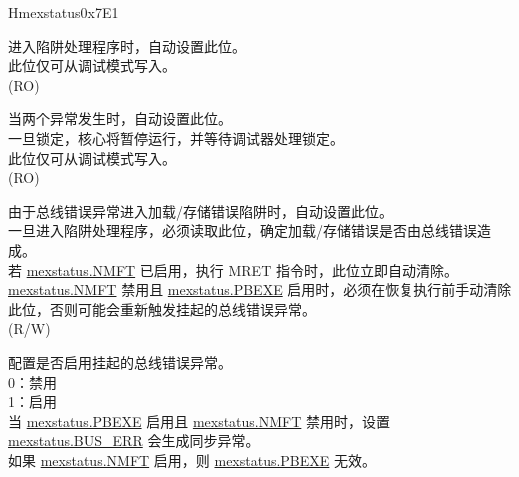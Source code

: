 \begin{register}{H}{mexstatus}{0x7E1}\label{regdesc:MEXSTATUS}%
%
%
%
%
%
%
%
%
%
%
%
%
%
\regnewline%
\begin{regdesc}\begin{reglist}
\label{fielddesc:MEXSTATUS_EXPT_VLD}\item [EXPT\_VLD] 进入陷阱处理程序时，自动设置此位。\\
此位仅可从调试模式写入。\\
(RO)
\label{fielddesc:MEXSTATUS_LOCKUP}\item [LOCKUP] 当两个异常发生时，自动设置此位。\\
一旦锁定，核心将暂停运行，并等待调试器处理锁定。\\
此位仅可从调试模式写入。\\
(RO)
\label{fielddesc:MEXSTATUS_BUS_ERR}\item [BUS\_ERR] 由于总线错误异常进入加载/存储错误陷阱时，自动设置此位。\\
一旦进入陷阱处理程序，必须读取此位，确定加载/存储错误是否由总线错误造成。\\
若 \hyperref[fielddesc:MEXSTATUS_NMFT]{mexstatus.NMFT} 已启用，执行 MRET 指令时，此位立即自动清除。\\
\hyperref[fielddesc:MEXSTATUS_NMFT]{mexstatus.NMFT} 禁用且 \hyperref[fielddesc:MEXSTATUS_PBEXE]{mexstatus.PBEXE} 启用时，必须在恢复执行前手动清除此位，否则可能会重新触发挂起的总线错误异常。\\
(R/W)
\label{fielddesc:MEXSTATUS_PBEXE}\item [PBEXE] 配置是否启用挂起的总线错误异常。\\
0：禁用\\
1：启用\\
当 \hyperref[fielddesc:MEXSTATUS_PBEXE]{mexstatus.PBEXE} 启用且 \hyperref[fielddesc:MEXSTATUS_NMFT]{mexstatus.NMFT} 禁用时，设置 \hyperref[fielddesc:MEXSTATUS_BUS_ERR]{mexstatus.BUS\_ERR} 会生成同步异常。\\
如果 \hyperref[fielddesc:MEXSTATUS_NMFT]{mexstatus.NMFT} 启用，则 \hyperref[fielddesc:MEXSTATUS_PBEXE]{mexstatus.PBEXE} 无效。\\

\end{reglist}
\end{regdesc}
\end{register}
